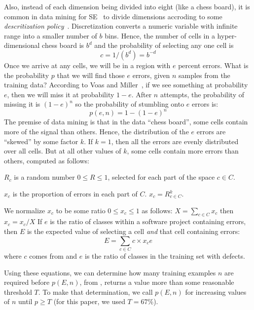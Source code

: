 Also,
instead of each dimension being divided into eight (like a chess board), it is common in data mining for SE~\cite{Menzies2014a}
to divide dimensions accroding to some {\em descritization policy}~\cite{lust08}.
Discretization converts a numeric variable with infinite range into a smaller number of  $b$ bins. Hence, the number of cells in a
hyper-dimensional chess board is $b^d$ and the probability of selecting any one cell is
\begin{equation}\label{eq:c}c=1/(b^d)=b^{-d}\end{equation}
Once we arrive at any cells, we will be in a region with $e$ percent errors.
What  is the probability $p$ that we will find those $e$ errors, given $n$ samples from the training data?
According to Voas and Miller~\cite{voas1995software},
if we see something at probability $e$, then we will miss it at probability $1-e$.
After $n$ attempts, the probability of missing it is $(1-e)^n$ so the probability of stumbling onto $e$ errors is:
\begin{equation}\label{eq:p}
p(e,n) = 1-(1-e)^n
\end{equation}
The premise of data mining is that in the data ``chess board'', some cells contain more of the signal than others. Hence, the 
distribution of the $e$ errors are ``skewed'' by some factor $k$. If $k=1$, then all the errors are evenly distributed over all cells.
But at all other values of $k$, some cells contain more errors than others, computed as follows:
    \squishlist
  \item $R_c$ is a random number $0\le R \le 1$, selected for each part of the space $c\in C$.
  \item $x_c$ is the proportion of errors in each part of $C$. \mbox{$x_c =  R_{c\in C}^k$}.
  \item We normalize $x_c$ to be some ratio $0 \le x_c \le 1$ as follows: $X= \sum_{c\in C} x_c$ then $x_c = x_c/X$
    \squishend
    If  $e$ is the ratio of classes within a software project containing errors, then $E$ 
    is the expected value  of selecting a cell {\em and} that cell containing errors:
    \begin{equation}\label{eq:E}
     E   = \sum_{c\in C}c \times x_ce
    \end{equation}
    where $c$ comes from  and $e$ is the ratio of classes in the training set with defects.


Using these equations, we can determine how many
training examples $n$ are required before $p(E,n)$, from 
, returns a value more than some reasonable
threshold $T$.  To make that determination, we call
$p(E,n)$ for increasing values of $n$ until $p \ge
T$ (for this paper, we used $T = 67\%$).

